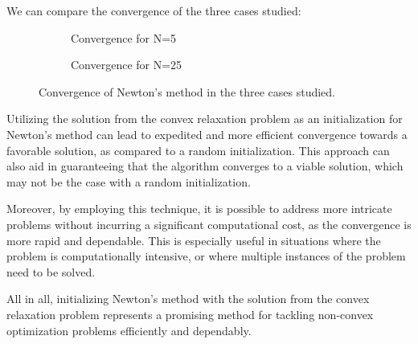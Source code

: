 \documentclass[10pt,a4paper,notitlepage,twocolumn]{article}
\begin{document}
We can compare the convergence of the three cases studied:
\begin{figure}[H]
    \centering
    \begin{subfigure}[b]{0.4\textwidth}
    
    
    \caption{Convergence for N=5}
    \end{subfigure}
    \hfill
    \begin{subfigure}[b]{0.4\textwidth}  
    
    \caption{Convergence for N=25}
    \end{subfigure}
    \caption{Convergence of Newton's method in the three cases studied.}
\end{figure}

Utilizing the solution from the convex relaxation problem as an initialization for Newton's method can lead to expedited and more efficient convergence towards a favorable solution, as compared to a random initialization. This approach can also aid in guaranteeing that the algorithm converges to a viable solution, which may not be the case with a random initialization.

Moreover, by employing this technique, it is possible to address more intricate problems without incurring a significant computational cost, as the convergence is more rapid and dependable. This is especially useful in situations where the problem is computationally intensive, or where multiple instances of the problem need to be solved.

All in all, initializing Newton's method with the solution from the convex relaxation problem represents a promising method for tackling non-convex optimization problems efficiently and dependably.
\end{document}
